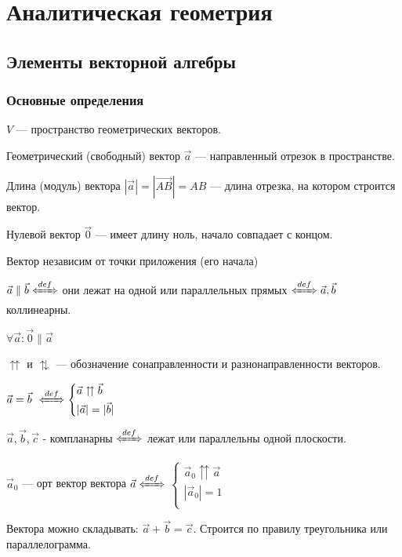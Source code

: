 \chapter{Аналитическая геометрия}
\section{Элементы векторной алгебры}
\subsection{Основные определения}
\(V\) --- пространство геометрических векторов.

Геометрический (свободный) вектор \(\vec a\) --- направленный отрезок в пространстве.

Длина (модуль) вектора \(|\vec a| = |\overrightarrow{AB}| = AB\) --- длина отрезка, на котором строится вектор.

Нулевой вектор \(\vec 0\) --- имеет длину ноль, начало совпадает с концом.

Вектор независим от точки приложения (его начала)

\(\vec a \parallel \vec b \defLeftrightarrow\) они лежат на одной или параллельных прямых \(\defLeftrightarrow\vec a,\vec b\) коллинеарны.

\(\forall \vec a:\vec 0 \parallel \vec a\)

\(\upuparrows\) и \(\updownarrows\) --- обозначение сонаправленности и разнонаправленности векторов.

\(
\vec a = \vec b\ \defLeftrightarrow
\begin{cases*}
    \vec a \upuparrows \vec b \\
    |\vec a| = |\vec b|       \\
\end{cases*}
\)

\(\vec a, \vec b, \vec c\) - компланарны \(\defLeftrightarrow\) лежат или параллельны одной плоскости.

\(\vec a_0\) --- орт вектор вектора \(\vec a \defLeftrightarrow\)
\(
\begin{cases*}
    \vec a_0 \upuparrows \vec a \\
    |\vec a_0| = 1              \\
\end{cases*}
\)

Вектора можно складывать: \(\vec a + \vec b = \vec c\). Строится по правилу треугольника или параллелограмма.

